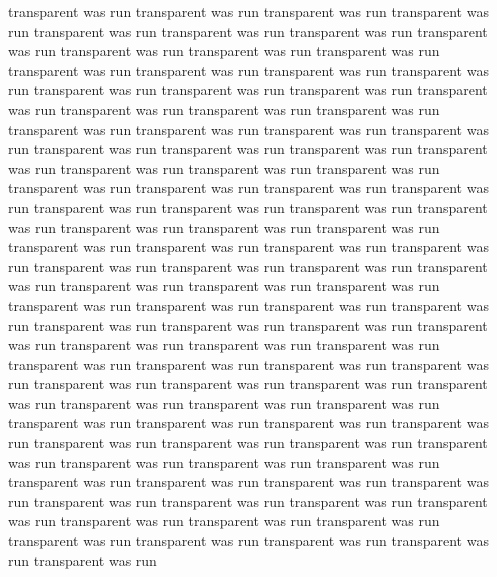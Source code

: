 transparent was run
transparent was run
transparent was run
transparent was run
transparent was run
transparent was run
transparent was run
transparent was run
transparent was run
transparent was run
transparent was run
transparent was run
transparent was run
transparent was run
transparent was run
transparent was run
transparent was run
transparent was run
transparent was run
transparent was run
transparent was run
transparent was run
transparent was run
transparent was run
transparent was run
transparent was run
transparent was run
transparent was run
transparent was run
transparent was run
transparent was run
transparent was run
transparent was run
transparent was run
transparent was run
transparent was run
transparent was run
transparent was run
transparent was run
transparent was run
transparent was run
transparent was run
transparent was run
transparent was run
transparent was run
transparent was run
transparent was run
transparent was run
transparent was run
transparent was run
transparent was run
transparent was run
transparent was run
transparent was run
transparent was run
transparent was run
transparent was run
transparent was run
transparent was run
transparent was run
transparent was run
transparent was run
transparent was run
transparent was run
transparent was run
transparent was run
transparent was run
transparent was run
transparent was run
transparent was run
transparent was run
transparent was run
transparent was run
transparent was run
transparent was run
transparent was run
transparent was run
transparent was run
transparent was run
transparent was run
transparent was run
transparent was run
transparent was run
transparent was run
transparent was run
transparent was run
transparent was run
transparent was run
transparent was run
transparent was run
transparent was run
transparent was run
transparent was run
transparent was run
transparent was run
transparent was run
transparent was run
transparent was run
transparent was run
transparent was run
transparent was run
transparent was run
transparent was run
transparent was run
